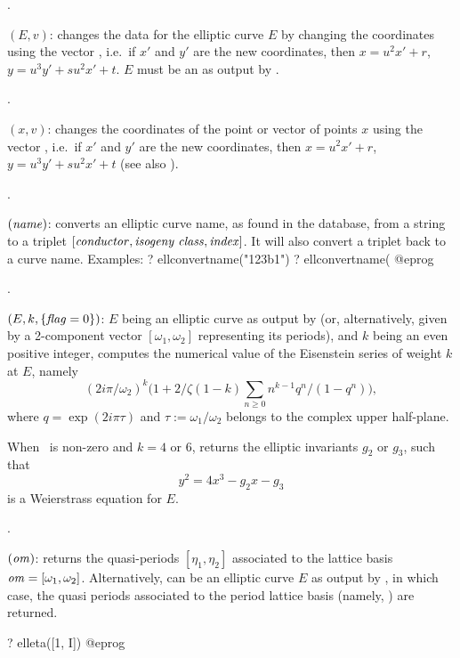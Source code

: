 .

$(E,v)$: changes the data for the elliptic curve $E$
by changing the coordinates using the vector , i.e.~if $x'$
and $y'$ are the new coordinates, then $x=u^2x'+r$, $y=u^3y'+su^2x'+t$.
$E$ must be an  as output by .

.

$(x,v)$: changes the coordinates of the point or
vector of points $x$ using the vector , i.e.~if $x'$ and
$y'$ are the new coordinates, then $x=u^2x'+r$, $y=u^3y'+su^2x'+t$ (see also
).

.

$(\hbox{\it name\/})$: 
converts an elliptic curve name, as found in the  database,
from a string to a triplet $[\hbox{\it conductor\/}, \hbox{\it isogeny class\/},
\hbox{\it index\/}]$. It will also convert a triplet back to a curve name.
Examples:
\bprog
? ellconvertname("123b1")
? ellconvertname(%
@eprog

.

$(E,k,\{\hbox{\it f\kern0pt lag\/}=0\})$: $E$ being an elliptic curve as
output by  (or, alternatively, given by a 2-component vector
$[\omega_1,\omega_2]$ representing its periods), and $k$ being an even
positive integer, computes the numerical value of the Eisenstein series of
weight $k$ at $E$, namely
$$
(2i \pi/\omega_2)^k
  \Big(1 + 2/\zeta(1-k) \sum_{n\geq 0} n^{k-1}q^n / (1-q^n)\Big),
$$
where $q = \exp(2i\pi \tau)$ and $\tau:=\omega_1/\omega_2$ belongs to the
complex upper half-plane.

When \fl\ is non-zero and $k=4$ or 6, returns the elliptic invariants $g_2$
or $g_3$, such that
 $$y^2 = 4x^3 - g_2 x - g_3$$
is a Weierstrass equation for $E$.

.

$(\hbox{\it om\/})$: returns the quasi-periods $[\eta_1,\eta_2]$
associated to the lattice basis $\hbox{\it om\/} = [\omega_1, \omega_2]$.
Alternatively,  can be an elliptic curve $E$ as output by
, in which case, the quasi periods associated to the period
lattice basis  (namely, ) are returned.

\bprog
  ? elleta([1, I])
@eprog

